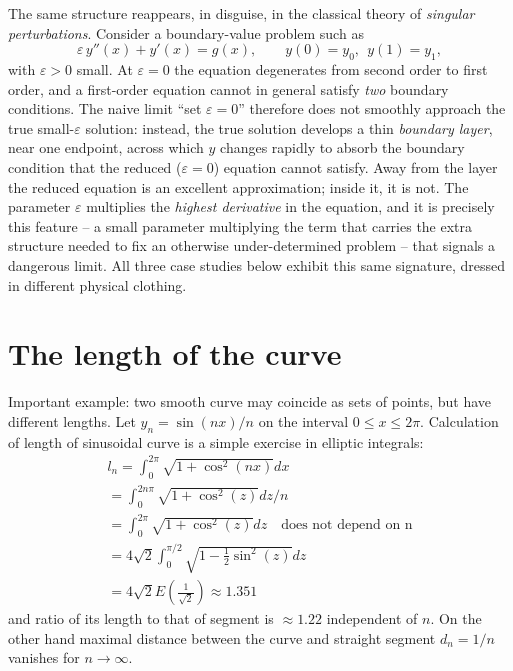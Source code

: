 The same structure reappears, in disguise, in the classical
theory of \emph{singular perturbations}. Consider a
boundary-value problem such as
\begin{equation}
\varepsilon\, y''(x) + y'(x) = g(x), \qquad y(0)=y_0,\ \ y(1)=y_1,
\end{equation}
with $\varepsilon>0$ small. At $\varepsilon=0$ the equation
degenerates from second order to first order, and a first-order
equation cannot in general satisfy \emph{two} boundary
conditions. The naive limit ``set $\varepsilon=0$'' therefore
does not smoothly approach the true small-$\varepsilon$
solution: instead, the true solution develops a thin
\emph{boundary layer}, near one endpoint, across which $y$
changes rapidly to absorb the boundary condition that the
reduced ($\varepsilon=0$) equation cannot satisfy. Away from the
layer the reduced equation is an excellent approximation; inside
it, it is not. The parameter $\varepsilon$ multiplies the
\emph{highest derivative} in the equation, and it is precisely
this feature -- a small parameter multiplying the term that
carries the extra structure needed to fix an otherwise
under-determined problem -- that signals a dangerous limit. All
three case studies below exhibit this same signature, dressed in
different physical clothing.

\section{The length of the curve}
\label{limits:curve-length}
Important example: two smooth curve may coincide as sets of points, but have
different lengths. Let $ y_n= \sin(n x)/n $ on the  interval $ 0\le x \le 2 \pi $. 
Calculation of length of sinusoidal curve is a simple exercise in elliptic integrals:
\begin{equation}
   \label {sin-length}
   \begin{split}
       l_n=\int_0^{2 \pi}\sqrt{1+\cos^2(nx)}dx\\
       =\int_0^{2 n \pi}\sqrt{1+\cos^2(z)}dz/n\\
       =\int_0^{2 \pi}\sqrt{1+\cos^2(z)}dz\quad \text{does not depend on n}  \\
       =4 \sqrt{2} \int_0^{\pi/2}\sqrt{1-\frac{1}{2} \sin^2(z)}dz\\
       =4 \sqrt{2} E(\frac{1}{\sqrt{2}}) \approx 1.351
   \end{split}
\end{equation}  
and ratio of its length to that of segment is $ \approx 1.22 $ independent of $ n $.
On the other hand maximal distance between the curve and straight segment $ d_n=1/n $ 
vanishes for $ n\rightarrow \infty $.

